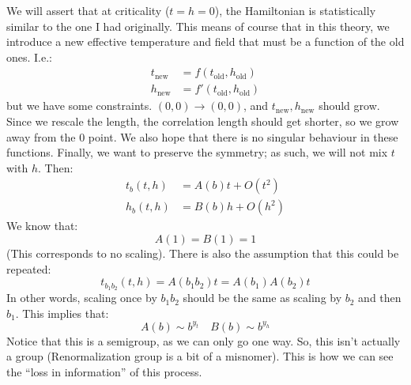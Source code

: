 We will assert that at criticality ($t = h = 0$), the Hamiltonian is statistically similar to the one I had originally. This means of course that in this theory, we introduce a new effective temperature and field that must be a function of the old ones. I.e.:
\begin{equation}
    \begin{split}
        t_{\text{new}} &= f(t_{\text{old}}, h_{\text{old}})
        \\ h_{\text{new}} &= f'(t_{\text{old}}, h_{\text{old}})
    \end{split}
\end{equation}
but we have some constraints. $(0, 0) \to (0, 0)$, and $t_{\text{new}}, h_{\text{new}}$ should grow. Since we rescale the length, the correlation length should get shorter, so we grow away from the $0$ point. We also hope that there is no singular behaviour in these functions. Finally, we want to preserve the symmetry; as such, we will not mix $t$ with $h$. Then:
\begin{equation}
    \begin{split}
        t_b(t, h) &= A(b)t + O(t^2)
        \\ h_b(t, h) &= B(b)h + O(h^2)
    \end{split}
\end{equation}
We know that:
\begin{equation}
    A(1) = B(1) = 1
\end{equation}
(This corresponds to no scaling). There is also the assumption that this could be repeated:
\begin{equation}
    t_{b_1b_2}(t, h) = A(b_1b_2)t = A(b_1)A(b_2)t
\end{equation}
In other words, scaling once by $b_1b_2$ should be the same as scaling by $b_2$ and then $b_1$. This implies that:
\begin{equation}
    A(b) \sim b^{y_t} \quad B(b) \sim b^{y_h}
\end{equation}
Notice that this is a semigroup, as we can only go one way. So, this isn't actually a group (Renormalization group is a bit of a misnomer). This is how we can see the ``loss in information'' of this process.

